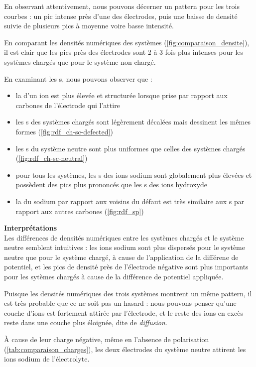 En observant attentivement, nous pouvons décerner un pattern pour les trois courbes : un pic intense près d'une des électrodes, puis une baisse de densité suivie de plusieurs pics à moyenne voire basse intensité.

En comparant les densités numériques des systèmes (\autoref{fig:comparaison_densite}), il est clair que les pics près des électrodes sont \num{2} à \num{3} fois plus intenses pour les systèmes chargés que pour le système non chargé.

En examinant les \rdf{}s, nous pouvons observer que :
\begin{itemize}
    \item la \rdf{} d'un ion est plus élevée et structurée lorsque prise par rapport aux carbones de l'électrode qui l'attire
    \item les \rdf{}s des systèmes chargés sont légèrement décalées mais dessinent les mêmes formes (\autoref{fig:rdf_ch-sc-defected})
    \item les \rdf{}s du système neutre sont plus uniformes que celles des systèmes chargés (\autoref{fig:rdf_ch-sc-neutral})
    \item pour tous les systèmes, les \rdf{}s des ions sodium sont globalement plus élevées et possèdent des pics plus prononcés que les \rdf{}s des ions hydroxyde
    \item la \rdf{} du sodium par rapport aux voisins du défaut est très similaire aux \rdf{}s par rapport aux autres carbones (\autoref{fig:rdf_sp})
\end{itemize}

\textbf{Interprétations}\\
Les différences de densités numériques entre les systèmes chargés et le système neutre semblent intuitives : les ions sodium sont plus dispersés pour le système neutre que pour le système chargé, à cause de l'application de la différene de potentiel, et les pics de densité près de l'électrode négative sont plus importants pour les sytèmes chargés à cause de la différence de potentiel appliquée.

Puisque les densités numériques des trois systèmes montrent un même pattern, il est très probable que ce ne soit pas un hasard : nous pouvons penser qu'une couche d'ions est fortement attirée par l'électrode, et le reste des ions en excès reste dans une couche plus éloignée, dite de \emph{diffusion}.

À cause de leur charge négative, même en l'absence de polarisation (\autoref{tab:comparaison_charges}), les deux électrodes du système neutre attirent les ions sodium de l'électrolyte.

